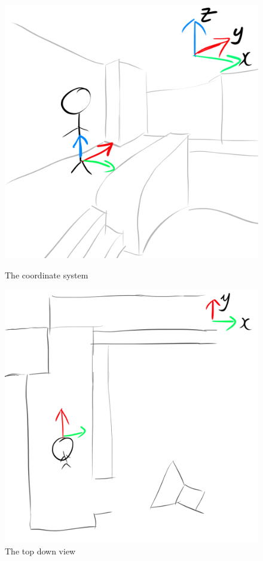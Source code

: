 \begin{figure}[H]
    \centering
    \begin{minipage}{.5\textwidth}
        \centering
        \includegraphics[width=0.9\linewidth]{assets/1coordinates.png}
        \caption{The coordinate system}
        \label{fig:1coordinates}
    \end{minipage}%
    \begin{minipage}{.5\textwidth}
        \centering
        \includegraphics[width=0.9\linewidth]{assets/2coordinate_topdown.png}
        \caption{The top down view}
        \label{fig:2coordinates_topdown}
    \end{minipage}
\end{figure}


